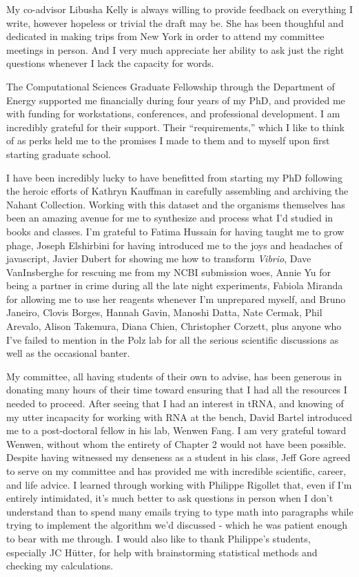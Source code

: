 \documentclass[12pt,twoside]{mitthesis-manusdown}
\begin{document}
My co-advisor Libusha Kelly is always willing to provide feedback on
everything I write, however hopeless or trivial the draft may be. She
has been thoughful and dedicated in making trips from New York in order
to attend my committee meetings in person. And I very much appreciate
her ability to ask just the right questions whenever I lack the capacity
for words.

The Computational Sciences Graduate Fellowship through the Department of
Energy supported me financially during four years of my PhD, and
provided me with funding for workstations, conferences, and professional
development. I am incredibly grateful for their support. Their
``requirements,'' which I like to think of as perks held me to the
promises I made to them and to myself upon first starting graduate
school.

I have been incredibly lucky to have benefitted from starting my PhD
following the heroic efforts of Kathryn Kauffman in carefully assembling
and archiving the Nahant Collection. Working with this dataset and the
organisms themselves has been an amazing avenue for me to synthesize and
process what I'd studied in books and classes. I'm grateful to Fatima
Hussain for having taught me to grow phage, Joseph Elshirbini for having
introduced me to the joys and headaches of javascript, Javier Dubert for
showing me how to transform \emph{Vibrio}, Dave VanInsberghe for
rescuing me from my NCBI submission woes, Annie Yu for being a partner
in crime during all the late night experiments, Fabiola Miranda for
allowing me to use her reagents whenever I'm unprepared myself, and
Bruno Janeiro, Clovis Borges, Hannah Gavin, Manoshi Datta, Nate Cermak,
Phil Arevalo, Alison Takemura, Diana Chien, Christopher Corzett, plus
anyone who I've failed to mention in the Polz lab for all the serious
scientific discussions as well as the occasional banter.

My committee, all having students of their own to advise, has been
generous in donating many hours of their time toward ensuring that I had
all the resources I needed to proceed. After seeing that I had an
interest in tRNA, and knowing of my utter incapacity for working with
RNA at the bench, David Bartel introduced me to a post-doctoral fellow
in his lab, Wenwen Fang. I am very grateful toward Wenwen, without whom
the entirety of Chapter 2 would not have been possible. Despite having
witnessed my denseness as a student in his class, Jeff Gore agreed to
serve on my committee and has provided me with incredible scientific,
career, and life advice. I learned through working with Philippe
Rigollet that, even if I'm entirely intimidated, it's much better to ask
questions in person when I don't understand than to spend many emails
trying to type math into paragraphs while trying to implement the
algorithm we'd discussed - which he was patient enough to bear with me
through. I would also like to thank Philippe's students, especially JC
Hütter, for help with brainstorming statistical methods and checking my
calculations.
\end{document}
